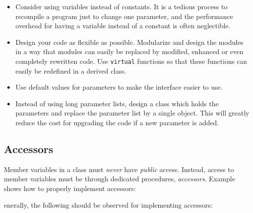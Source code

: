 \begin{itemize}
  
  \item Consider using variables instead of constants.  It is a
  tedious process to recompile a program just to change one
  parameter, and the performance overhead for having a variable
  instead of a constant is often neglectible.
  
  \item Design your code as flexible as possible.  Modularize and 
  design the modules in a way that modules can easily be replaced by 
  modified, enhanced or even completely rewritten code.  Use 
  \texttt{virtual} functions so that these functions can easily be 
  redefined in a derived class.
  
  \item Use default values for parameters to make the interface easier 
  to use.

  \item Instead of using long parameter lists, design a class which holds 
  the parameters and replace the parameter list by a single object. 
  This will greatly reduce the cost for upgrading the code if a new 
  parameter is added.
  
\end{itemize}




\subsection{Accessors}
\label{s:CS:Accessors}

Member variables in a class must \emph{never} have \emph{public}
access.  Instead, access to member variables must be through
dedicated procedures, \emph{accessors}. Example
shows how to properly implement accessors:

enerally, the following should be observed for implementing
accessors:

